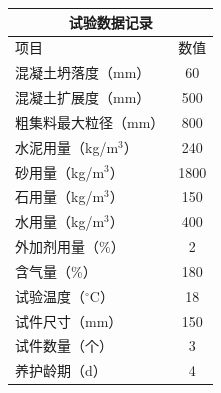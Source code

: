 \documentclass[UTF8,10pt,a4paper,fontset=fandol]{ctexart}
\newcommand{\fieldvalue}[1]{#1}
\begin{document}
\vspace{2mm}

\noindent
\small
\begin{tabularx}{\textwidth}{|X|c|}
\hline
\multicolumn{2}{|c|}{试验数据记录} \\ \hline
项目 & 数值 \\ \hline
混凝土坍落度（mm） &
\fieldvalue{60}
\\ \hline
混凝土扩展度（mm） &
\fieldvalue{500}
\\ \hline
粗集料最大粒径（mm） &
\fieldvalue{800}
\\ \hline
水泥用量（kg/m$^3$） &
\fieldvalue{240}
\\ \hline
砂用量（kg/m$^3$） &
\fieldvalue{1800}
\\ \hline
石用量（kg/m$^3$） &
\fieldvalue{150}
\\ \hline
水用量（kg/m$^3$） &
\fieldvalue{400}
\\ \hline
外加剂用量（\%） &
\fieldvalue{2}
\\ \hline
含气量（\%） &
\fieldvalue{180}
\\ \hline
试验温度（$^\circ$C） &
\fieldvalue{18}
\\ \hline
试件尺寸（mm） &
\fieldvalue{150}
\\ \hline
试件数量（个） &
\fieldvalue{3}
\\ \hline
养护龄期（d） &
\fieldvalue{4}
\\ \hline
\end{tabularx}
\normalsize

\end{document}
